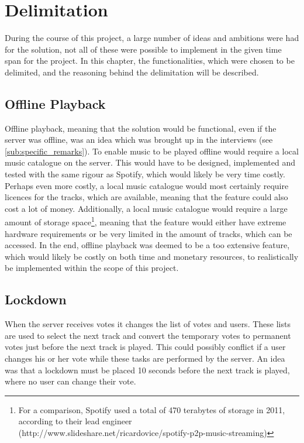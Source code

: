 \chapter{Delimitation}
During the course of this project, a large number of ideas and ambitions were had for the solution, not all of these were possible to implement in the given time span for the project. In this chapter, the functionalities, which were chosen to be delimited, and the reasoning behind the delimitation will be described.

\section{Offline Playback}
Offline playback, meaning that the solution would be functional, even if the server was offline, was an idea which was brought up in the interviews (see \cref{sub:specific_remarks}).
To enable music to be played offline would require a local music catalogue on the server. This would have to be designed, implemented and tested with the same rigour as Spotify, which would likely be very time costly.
Perhaps even more costly, a local music catalogue would most certainly require licences for the tracks, which are available, meaning that the feature could also cost a lot of money. Additionally, a local music catalogue would require a large amount of storage space\footnote{For a comparison, Spotify used a total of 470 terabytes of storage in 2011, according to their lead engineer (http://www.slideshare.net/ricardovice/spotify-p2p-music-streaming)}, meaning that the feature would either have extreme hardware requirements or be very limited in the amount of tracks, which can be accessed.
In the end, offline playback was deemed to be a too extensive feature, which would likely be costly on both time and monetary resources, to realistically be implemented within the scope of this project.

\section{Lockdown}
When the server receives votes it changes the list of votes and
users. These lists are used to select the next track and convert the
temporary votes to permanent votes just before the next track is
played. This could possibly conflict if a user changes his or her vote
while these tasks are performed by the server. An idea was that a lockdown must be placed 10 seconds before the next track is played, where no user can change their vote.

